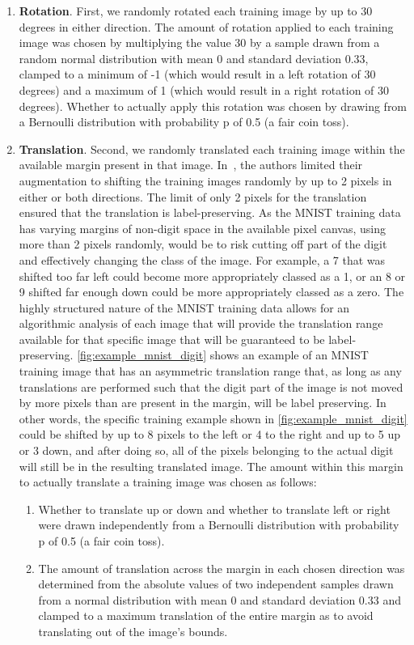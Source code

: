 \documentclass{article}
\newcommand{\rightparenthesis}{)}
\begin{document}
\begin{enumerate}[label=\arabic*\rightparenthesis] \item \textbf{Rotation}.  First, we randomly rotated each training image by up to 30 degrees in either direction.  The amount of rotation applied to each training image was chosen by multiplying the value 30 by a sample drawn from a random normal distribution with mean 0 and standard deviation 0.33, clamped to a minimum of -1 (which would result in a left rotation of 30 degrees) and a maximum of 1 (which would result in a right rotation of 30 degrees).  Whether to actually apply this rotation was chosen by drawing from a Bernoulli distribution with probability p of 0.5 (a fair coin toss).
\item \textbf{Translation}.  Second, we randomly translated each training image within the available margin present in that image.  In~\cite{Sabour2017}, the authors limited their augmentation to shifting the training images randomly by up to 2 pixels in either or both directions.  The limit of only 2 pixels for the translation ensured that the translation is label-preserving.  As the MNIST training data has varying margins of non-digit space in the available  pixel canvas, using more than 2 pixels randomly, would be to risk cutting off part of the digit and effectively changing the class of the image.  For example, a 7 that was shifted too far left could become more appropriately classed as a 1, or an 8 or 9 shifted far enough down could be more appropriately classed as a zero.  The highly structured nature of the MNIST training data allows for an algorithmic analysis of each image that will provide the translation range available for that specific image that will be guaranteed to be label-preserving.  \autoref{fig:example_mnist_digit} shows an example of an MNIST training image that has an asymmetric translation range that, as long as any translations are performed such that the digit part of the image is not moved by more pixels than are present in the margin, will be label preserving.  In other words, the specific training example shown in \autoref{fig:example_mnist_digit} could be shifted by up to 8 pixels to the left or 4 to the right and up to 5 up or 3 down, and after doing so, all of the pixels belonging to the actual digit will still be in the resulting translated image.  The amount within this margin to actually translate a training image was chosen as follows:
\begin{enumerate}[label=\alph*\rightparenthesis]
\item Whether to translate up or down and whether to translate left or right were drawn independently from a Bernoulli distribution with probability p of 0.5 (a fair coin toss).
\item The amount of translation across the margin in each chosen direction was determined from the absolute values of two independent samples drawn from a normal distribution with mean 0 and standard deviation 0.33 and clamped to a maximum translation of the entire margin as to avoid translating out of the image's bounds.
\end{enumerate}


\end{enumerate}
\end{document}
